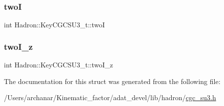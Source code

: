\mbox{\label{structHadron_1_1KeyCGCSU3__t_a0c1919df3ee3e6a2a98899d4949f7821}} 
\subsubsection{\texorpdfstring{twoI}{twoI}}
{\footnotesize\ttfamily int Hadron\+::\+Key\+C\+G\+C\+S\+U3\+\_\+t\+::twoI}

\mbox{\label{structHadron_1_1KeyCGCSU3__t_a2327b80f179837e064ee74a124d58ee9}} 
\subsubsection{\texorpdfstring{twoI\_z}{twoI\_z}}
{\footnotesize\ttfamily int Hadron\+::\+Key\+C\+G\+C\+S\+U3\+\_\+t\+::two\+I\+\_\+z}



The documentation for this struct was generated from the following file\+:\begin{DoxyCompactItemize}
\item 
/\+Users/archanar/\+Kinematic\+\_\+factor/adat\+\_\+devel/lib/hadron/\mbox{\hyperlink{lib_2hadron_2cgc__su3_8h}{cgc\+\_\+su3.\+h}}\end{DoxyCompactItemize}
